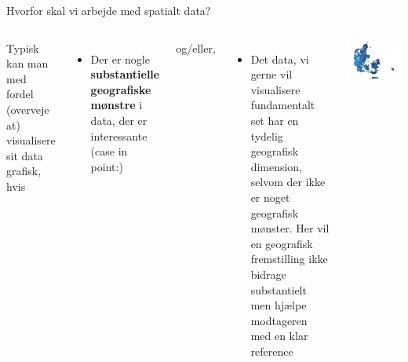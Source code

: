 \documentclass[
  8pt,
  ignorenonframetext,
  aspectratio=169]{beamer}
\providecommand{\tightlist}{%
  \setlength{\itemsep}{0pt}\setlength{\parskip}{0pt}}
\newcommand{\columnsbegin}{\begin{columns}}
\newcommand{\columnsend}{\end{columns}}
\begin{document}
\begin{frame}{Hvorfor skal vi arbejde med spatialt data?}
\protect\hypertarget{hvorfor-skal-vi-arbejde-med-spatialt-data-1}{}
\columnsbegin


Typisk kan man med fordel (overveje at) visualisere sit data grafisk,
hvis

\begin{itemize}
\tightlist
\item
  Der er nogle \textbf{substantielle geografiske mønstre} i data, der er
  interessante (case in point:)
\end{itemize}

og/eller,

\begin{itemize}
\tightlist
\item
  Det data, vi gerne vil visualisere fundamentalt set har en tydelig
  geografisk dimension, selvom der ikke er noget geografisk mønster. Her
  vil en geografisk fremstilling ikke bidrage substantielt men hjælpe
  modtageren med en klar reference
\end{itemize}


\tiny

\includegraphics[width=1\linewidth]{crashcourse_slides_files/figure-beamer/unnamed-chunk-4-1}

\normalsize

\columnsend
\end{frame}
\end{document}
